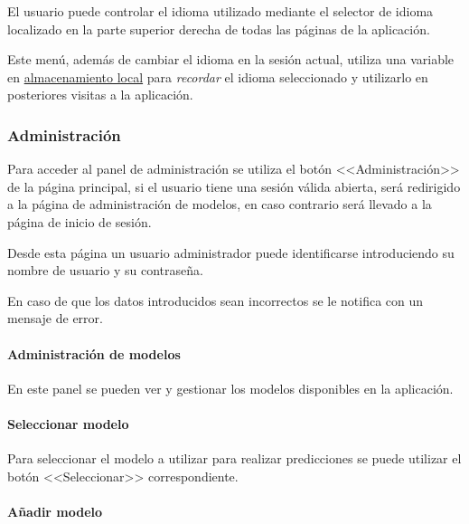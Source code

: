 El usuario puede controlar el idioma utilizado mediante el selector de idioma
localizado en la parte superior derecha de todas las páginas de la aplicación.


Este menú, además de cambiar el idioma en la sesión actual, utiliza una variable
en
\href{https://developer.mozilla.org/es/docs/Web/API/Window/localStorage}{almacenamiento
local} para \textit{recordar} el idioma seleccionado y utilizarlo en posteriores
visitas a la aplicación.

\subsubsection{Administración}

Para acceder al panel de administración se utiliza el botón <<Administración>>
de la página principal, si el usuario tiene una sesión válida abierta, será
redirigido a la página de administración de modelos, en caso contrario será
llevado a la página de inicio de sesión.


Desde esta página un usuario administrador puede identificarse introduciendo su
nombre de usuario y su contraseña.

En caso de que los datos introducidos sean incorrectos se le notifica con un
mensaje de error.


\paragraph{Administración de modelos}

En este panel se pueden ver y gestionar los modelos disponibles en la
aplicación.

\paragraph{Seleccionar modelo}

Para seleccionar el modelo a utilizar para realizar predicciones se puede
utilizar el botón <<Seleccionar>> correspondiente.


\paragraph{Añadir modelo}

